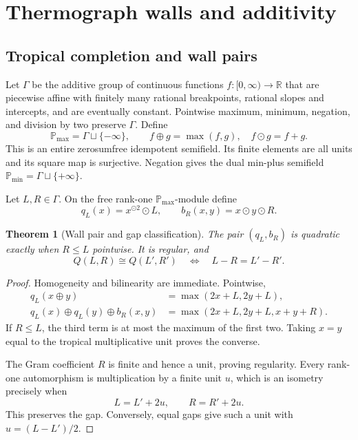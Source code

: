 \documentclass[11pt]{article}
\newtheorem{theorem}{Theorem}[section]
\theoremstyle{definition}
\theoremstyle{remark}
\begin{document}
\section{Thermograph walls and additivity}\label{sec:walls}

\subsection{Tropical completion and wall pairs}

Let \(\Gamma\) be the additive group of continuous functions
\(f:[0,\infty)\to\mathbb R\) that are piecewise affine with finitely many
rational breakpoints, rational slopes and intercepts, and are eventually
constant.  Pointwise maximum, minimum, negation, and division by two preserve
\(\Gamma\).  Define
\[
 \mathbb P_{\max}=\Gamma\sqcup\{-\infty\},\qquad
 f\oplus g=\max(f,g),\quad f\odot g=f+g.
\]
This is an entire zerosumfree idempotent semifield.  Its finite elements are
all units and its square map is surjective.  Negation gives the dual
min-plus semifield \(\mathbb P_{\min}=\Gamma\sqcup\{+\infty\}\).

Let \(L,R\in\Gamma\).  On the free rank-one
\(\mathbb P_{\max}\)-module define
\[
 q_L(x)=x^{\odot2}\odot L,
 \qquad b_R(x,y)=x\odot y\odot R.
\]

\begin{theorem}[Wall pair and gap classification]\label{thm:wallpair}
The pair \((q_L,b_R)\) is quadratic exactly when \(R\le L\) pointwise.  It is
regular, and
\[
 Q(L,R)\cong Q(L',R')
 \quad\Longleftrightarrow\quad
 L-R=L'-R'.
\]
\end{theorem}

\begin{proof}
Homogeneity and bilinearity are immediate.  Pointwise,
\begin{align*}
 q_L(x\oplus y)&=\max(2x+L,2y+L),\\
 q_L(x)\oplus q_L(y)\oplus b_R(x,y)
 &=\max(2x+L,2y+L,x+y+R).
\end{align*}
If \(R\le L\), the third term is at most the maximum of the first two.  Taking
\(x=y\) equal to the tropical multiplicative unit proves the converse.

The Gram coefficient \(R\) is finite and hence a unit, proving regularity.
Every rank-one automorphism is multiplication by a finite unit \(u\), which is
an isometry precisely when
\[
 L=L'+2u,\qquad R=R'+2u.
\]
This preserves the gap.  Conversely, equal gaps give such a unit with
\(u=(L-L')/2\).
\end{proof}
\end{document}

